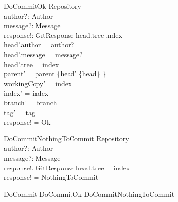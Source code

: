 \begin{schema}{DoCommitOk}
	\Delta Repository \\
	author?: Author \\
	message?: Message \\
	response!: GitResponse
\where
	head.tree \neq index \\
	head'.author = author? \\
	head'.message = message? \\
	head'.tree = index \\
	parent' = parent \cup \{head' \mapsto \{head\} \} \\
	workingCopy' = index \\
	index' = index \\
	branch' = branch \\
	tag' = tag \\
	response! = Ok
\end{schema}

\begin{schema}{DoCommitNothingToCommit}
	\Xi Repository \\
	author?: Author \\
	message?: Message \\
	response!: GitResponse
\where
	head.tree = index \\
	response! = NothingToCommit
\end{schema}

\begin{zed}
	DoCommit  DoCommitOk \lor DoCommitNothingToCommit
\end{zed}
